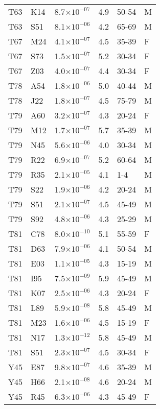 \begin{longtable}{lllrll}
   T63 & K14 & 8.7$\times10^{-07}$ & 4.9 & 50-54 & M \\ 
   T63 & S51 & 8.1$\times10^{-06}$ & 4.2 & 65-69 & M \\ 
   T67 & M24 & 4.1$\times10^{-07}$ & 4.5 & 35-39 & F \\ 
   T67 & S73 & 1.5$\times10^{-07}$ & 5.2 & 30-34 & F \\ 
   T67 & Z03 & 4.0$\times10^{-07}$ & 4.4 & 30-34 & F \\ 
   T78 & A54 & 1.8$\times10^{-06}$ & 5.0 & 40-44 & M \\ 
   T78 & J22 & 1.8$\times10^{-07}$ & 4.5 & 75-79 & M \\ 
   T79 & A60 & 3.2$\times10^{-07}$ & 4.3 & 20-24 & F \\ 
   T79 & M12 & 1.7$\times10^{-07}$ & 5.7 & 35-39 & M \\ 
   T79 & N45 & 5.6$\times10^{-06}$ & 4.0 & 30-34 & M \\ 
   T79 & R22 & 6.9$\times10^{-07}$ & 5.2 & 60-64 & M \\ 
   T79 & R35 & 2.1$\times10^{-05}$ & 4.1 & 1-4 & M \\ 
   T79 & S22 & 1.9$\times10^{-06}$ & 4.2 & 20-24 & M \\ 
   T79 & S51 & 2.1$\times10^{-07}$ & 4.5 & 45-49 & M \\ 
   T79 & S92 & 4.8$\times10^{-06}$ & 4.3 & 25-29 & M \\ 
   T81 & C78 & 8.0$\times10^{-10}$ & 5.1 & 55-59 & F \\ 
   T81 & D63 & 7.9$\times10^{-06}$ & 4.1 & 50-54 & M \\ 
   T81 & E03 & 1.1$\times10^{-05}$ & 4.3 & 15-19 & M \\ 
   T81 & I95 & 7.5$\times10^{-09}$ & 5.9 & 45-49 & M \\ 
   T81 & K07 & 2.5$\times10^{-06}$ & 4.3 & 20-24 & F \\ 
   T81 & L89 & 5.9$\times10^{-08}$ & 5.8 & 45-49 & M \\ 
   T81 & M23 & 1.6$\times10^{-06}$ & 4.5 & 15-19 & F \\ 
   T81 & N17 & 1.3$\times10^{-12}$ & 5.8 & 45-49 & M \\ 
   T81 & S51 & 2.3$\times10^{-07}$ & 4.5 & 30-34 & F \\ 
   Y45 & E87 & 9.8$\times10^{-07}$ & 4.6 & 35-39 & M \\ 
   Y45 & H66 & 2.1$\times10^{-08}$ & 4.6 & 20-24 & M \\ 
   Y45 & R45 & 6.3$\times10^{-06}$ & 4.3 & 45-49 & F \\ 

\end{longtable}
